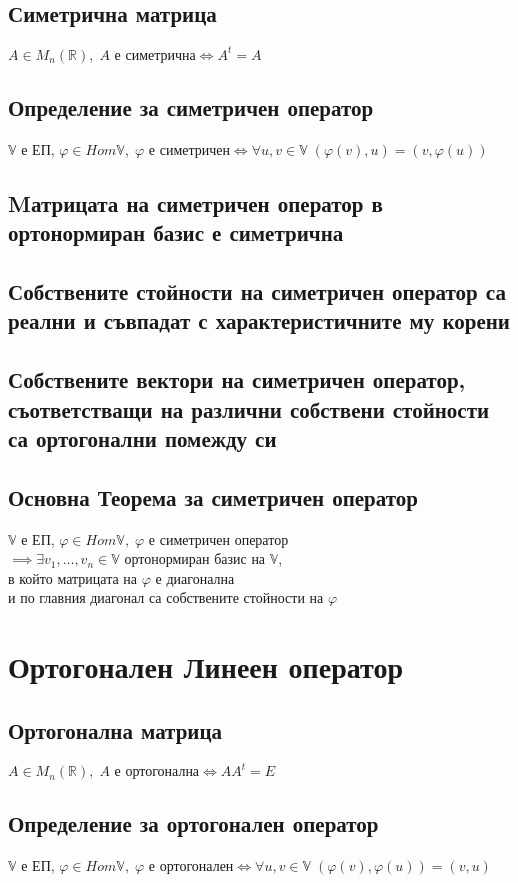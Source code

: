 \documentclass{article}
\newcommand{\V}{\mathbb{V}}
\newcommand{\R}{\mathbb{R}}
\newcommand{\n}[1]{#1_1, \dots, #1_n}
\begin{document}
    \subsection{Симетрична матрица}
    \(A \in M_n(\R), \; A \text{ е симетрична} \iff A^t = A\)
    \subsection{Определение за симетричен оператор}
    \(\V\) е ЕП, \(\varphi \in Hom\V, \; \varphi \text{ е симетричен} \iff \forall u, v \in \V \; (\varphi(v), u) = (v, \varphi(u))\)
    \subsection{Mатрицата на симетричен оператор в ортонормиран базис е симетрична}
    \subsection{Собствените стойности на симетричен оператор са реални и съвпадат с характеристичните му корени}
    \subsection{Собствените вектори на симетричен оператор, съответстващи на различни собствени стойности са ортогонални помежду си}
    \subsection{Основна Теорема за симетричен оператор}
    \(\V\) е ЕП, \(\varphi \in Hom\V, \; \varphi\) е симетричен оператор\\
    \(\implies \exists \n{v} \in \V\) ортонормиран базис на \(\V\),\\
    в който матрицата на \(\varphi\) е диагонална\\
    и по главния диагонал са собствените стойности на \(\varphi\) 
    \section{Ортогонален Линеен оператор}
    \subsection{Ортогонална матрица}
    \(A \in M_n(\R), \; A \text{ е ортогонална} \iff AA^t = E\)
    \subsection{Определение за ортогонален оператор}
    \(\V\) е ЕП, \(\varphi \in Hom\V, \; \varphi \text{ е ортогонален} \iff \forall u, v \in \V \; (\varphi(v), \varphi(u)) = (v, u)\)
\end{document}
